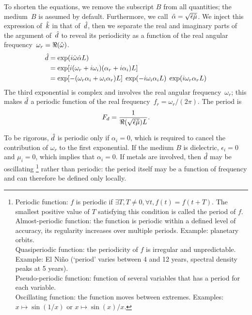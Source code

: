 To shorten the equations, we remove the subscript $B$ from all quantities; the medium~$B$ is assumed by default.
Furthermore, we call~$\hat{\alpha}=\sqrt{\hat{\epsilon} \hat{\mu}}$.
We inject this expression of~$\hat{k}$ in that of~$\hat{d}$, then we separate the real and imaginary parts of the argument of~$\hat{d}$ to reveal its periodicity as a function of the real angular frequency~$\omega_r = \Re(\hat{\omega})$.
\begin{subequations}
    \label{eq:distance_coefficient_expanded}
    \begin{align}
        \cp{d}
        &=
        \exp \left( i \cp{\omega} \cp{\alpha} L \right)
        \\
        &=
        \exp
        \left[
            i
            (\omega_r + i \omega_i) (\alpha_r + i \alpha_i)
            L
        \right]
        \\
        &=
        \exp
        \left[
            -
            (\omega_r \alpha_i + \omega_i \alpha_r)
            L
        \right]
        \;
        \exp
        \left(
            -i \omega_i \alpha_i L
        \right)
        \;
        \exp
        \left(
            i \omega_r \alpha_r L
        \right)
    \end{align}
\end{subequations}
The third exponential is complex and involves the real angular frequency~$\omega_r$;
this makes $\hat{d}$ a periodic function of the real frequency~$f_r=\omega_r/(2\pi)$.
The period is
\begin{equation}
    F_d = 
    \frac{1}{\Re(\sqrt{\hat{\epsilon}\hat{\mu}})L}
    \text{.}
\end{equation}

To be rigorous, $\hat{d}$ is periodic only if $\alpha_i=0$, which is required to cancel the contribution of $\omega_r$ to the first exponential.
If the medium $B$ is dielectric, $\epsilon_i=0$ and $\mu_i=0$, which implies that $\alpha_i=0$.
If metals are involved, then $\hat{d}$ may be oscillating%
\footnote{
Periodic function: $f$ is periodic if $\exists T, T \ne 0, \forall t, f(t)=f(t+T)$.  The smallest positive value of $T$ satisfying this condition is called the period of $f$.\\
Almost-periodic function: the function is periodic within a defined level of accuracy, its regularity increases over multiple periods.  Example: planetary orbits.\\
Quasiperiodic function: the periodicity of $f$ is irregular and unpredictable.  Example: El Ni\~no (`period' varies between 4 and 12 years, spectral density peaks at 5 years).\\
Pseudo-periodic function: function of several variables that has a period for each variable.\\
Oscillating function: the function moves between extremes.  Examples: $x \mapsto \sin(1/x)$ or $x \mapsto \sin(x)/x$.
}
rather than periodic: the period itself may be a function of frequency and can therefore be defined only locally.



